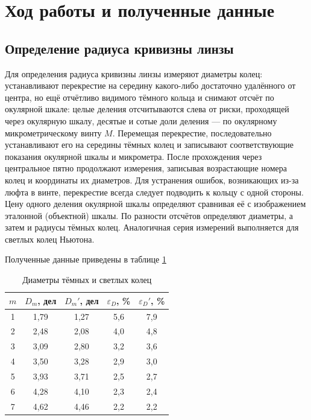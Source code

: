 \documentclass[a4paper,12pt]{article} %
\begin{document}
\section{Ход работы и полученные данные}

\subsection{Определение радиуса кривизны линзы}

Для определения радиуса кривизны линзы измеряют диаметры колец: устанавливают перекрестие на середину какого-либо достаточно удалённого от центра, но ещё отчётливо видимого тёмного кольца и снимают отсчёт по окулярной шкале: целые деления отсчитываются слева от риски, проходящей через окулярную шкалу, десятые и сотые доли деления — по окулярному микрометрическому винту $M$.
Перемещая перекрестие, последовательно устанавливают его на середины тёмных колец и записывают соответствующие показания окулярной шкалы и микрометра. После прохождения через центральное пятно продолжают измерения, записывая возрастающие номера колец и координаты их диаметров. Для устранения ошибок, возникающих из-за люфта в винте, перекрестие всегда следует подводить к кольцу с одной стороны. Цену одного деления окулярной шкалы определяют сравнивая её с изображением эталонной (объектной) шкалы. По разности отсчётов определяют диаметры, а затем и радиусы тёмных колец. Аналогичная серия измерений выполняется для светлых колец Ньютона.

Полученные данные приведены в таблице \ref{radi}

\begin{table}[H]
    \centering
    \begin{tabular}{|c|c|c|c|c|}
        \hline $m$ & $D_m$, дел & $D_m'$, дел & $\varepsilon_D$, \% & $\varepsilon_D'$, \% \\ \hline
        1 & 1,79 & 1,27 & 5,6 & 7,9 \\ \hline
        2 & 2,48 & 2,08 & 4,0 & 4,8 \\ \hline
        3 & 3,09 & 2,80 & 3,2 & 3,6 \\ \hline
        4 & 3,50 & 3,28 & 2,9 & 3,0 \\ \hline
        5 & 3,93 & 3,71 & 2,5 & 2,7 \\ \hline
        6 & 4,28 & 4,10 & 2,3 & 2,4 \\ \hline
        7 & 4,62 & 4,46 & 2,2 & 2,2 \\ \hline
    \end{tabular}
    \caption{Диаметры тёмных и светлых колец}
    \label{radi}
\end{table}
\end{document}
